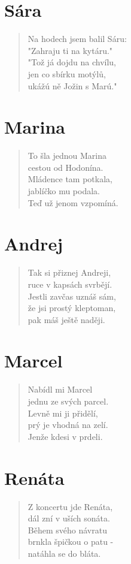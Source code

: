 \section*{Sára}
\begin{verse}
Na hodech jsem balil Sáru:\\
"Zahraju ti na kytáru."\\
"Tož já dojdu na chvílu,\\
jen co sbírku motýlů,\\
ukážú ně Jožin s Marú."
\end{verse}

\section*{Marina}
\begin{verse}
To šla jednou Marina\\
cestou od Hodonína.\\
Mládence tam potkala,\\
jablíčko mu podala.\\
Teď už jenom vzpomíná.
\end{verse}

\section*{Andrej}
\begin{verse}
Tak si přiznej Andreji,\\
ruce v kapsách svrbějí.\\
Jestli zavčas uznáš sám,\\
že jsi prostý kleptoman,\\
pak máš ještě naději.
\end{verse}

\section*{Marcel}
\begin{verse}
Nabídl mi Marcel\\
jednu ze svých parcel.\\
Levně mi ji přidělí,\\
prý je vhodná na zelí.\\
Jenže kdesi v prdeli.
\end{verse}

\section*{Renáta}
\begin{verse}
Z koncertu jde Renáta,\\
dál zní v uších sonáta.\\
Během svého návratu\\
brnkla špičkou o patu -\\
natáhla se do bláta.
\end{verse}

